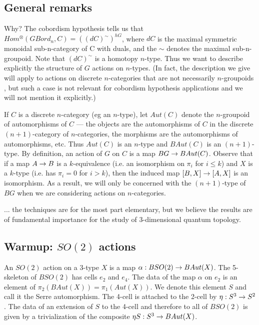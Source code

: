 \documentclass{amsart}
\begin{document}

\subsection{General remarks}

Why? The cobordism hypothesis tells us that $Hom^{\otimes}(GBord_n,C) = ((dC)^{\sim})^{hG}$, where $dC$ is the maximal symmetric monoidal sub-n-category of C with duals, and the $\sim$ denotes the maximal sub-n-groupoid.  Note that $(dC)^\sim$ is a homotopy $n$-type.  Thus we want to describe explicitly the structure of $G$ actions on $n$-types.  (In fact, the description we give will apply to actions on discrete $n$-categories that are not necessarily $n$-groupoids , but such a case is not relevant for cobordism hypothesis applications and we will not mention it explicitly.)

If $C$ is a discrete $n$-category (eg an $n$-type), let $Aut(C)$ denote the $n$-groupoid of automorphisms of $C$ --- the objects are the automorphisms of $C$ in the discrete $(n+1)$-category of $n$-categories, the morphisms are the automorphisms of automorphisms, etc.  Thus $Aut(C)$ is an $n$-type and $BAut(C)$ is an $(n+1)$-type.  By definition, an action of $G$ on $C$ is a map $BG \rightarrow BAut(C)$.  Observe that if a map $A \rightarrow B$ is a $k$-equivalence (i.e. an isomorphism on $\pi_i$ for $i \leq k$) and $X$ is a $k$-type (i.e. has $\pi_i = 0$ for $i > k$), then the induced map $[B,X] \rightarrow [A,X]$ is an isomorphism.  As a result, we will only be concerned with the $(n+1)$-type of $BG$ when we are considering actions on $n$-categories.

... the techniques are for the most part elementary, but we believe the results are of fundamental importance for the study of 3-dimensional quantum topology.


\subsection{Warmup: $SO(2)$ actions}

An $SO(2)$ action on a 3-type $X$ is a map $\alpha: BSO(2) \rightarrow BAut(X)$.  The 5-skeleton of $BSO(2)$ has cells $e_2$ and $e_4$.  The data of the map $\alpha$ on $e_2$ is an element of $\pi_2(BAut(X)) = \pi_1(Aut(X))$.  We denote this element $S$ and call it the Serre automorphism.  The 4-cell is attached to the 2-cell by $\eta : S^3 \rightarrow S^2$.  The data of an extension of $S$ to the 4-cell and therefore to all of $BSO(2)$ is given by a trivialization of the composite $\eta S : S^3 \rightarrow BAut(X)$.
\end{document}
